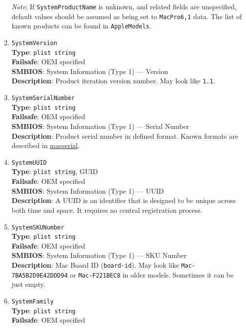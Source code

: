 \documentclass[]{article}
\begin{document}
\begin{enumerate}
  \emph{Note}: If \texttt{SystemProductName} is unknown, and related
  fields are unspecified, default values should be assumed as being set
  to \texttt{MacPro6,1} data. The list of known products can be found in
  \texttt{AppleModels}.
\item
  \texttt{SystemVersion}\\
  \textbf{Type}: \texttt{plist\ string}\\
  \textbf{Failsafe}: OEM specified\\
  \textbf{SMBIOS}: System Information (Type 1) --- Version\\
  \textbf{Description}: Product iteration version number. May look like
  \texttt{1.1}.
\item
  \texttt{SystemSerialNumber}\\
  \textbf{Type}: \texttt{plist\ string}\\
  \textbf{Failsafe}: OEM specified\\
  \textbf{SMBIOS}: System Information (Type 1) --- Serial Number\\
  \textbf{Description}: Product serial number in defined format. Known
  formats are described in
  \href{https://github.com/acidanthera/OpenCorePkg/blob/master/Utilities/macserial/FORMAT.md}{macserial}.
\item
  \texttt{SystemUUID}\\
  \textbf{Type}: \texttt{plist\ string}, GUID\\
  \textbf{Failsafe}: OEM specified\\
  \textbf{SMBIOS}: System Information (Type 1) --- UUID\\
  \textbf{Description}: A UUID is an identifier that is designed to be
  unique across both time and space. It requires no central registration
  process.
\item
  \texttt{SystemSKUNumber}\\
  \textbf{Type}: \texttt{plist\ string}\\
  \textbf{Failsafe}: OEM specified\\
  \textbf{SMBIOS}: System Information (Type 1) --- SKU Number\\
  \textbf{Description}: Mac Board ID (\texttt{board-id}). May look like
  \texttt{Mac-7BA5B2D9E42DDD94} or \texttt{Mac-F221BEC8} in older
  models. Sometimes it can be just empty.
\item
  \texttt{SystemFamily}\\
  \textbf{Type}: \texttt{plist\ string}\\
  \textbf{Failsafe}: OEM specified\\

\end{enumerate}
\end{document}
